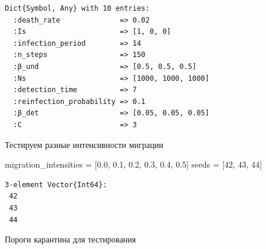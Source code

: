 \documentclass[
  12pt,
  a4paper,
  DIV=11,
  numbers=noendperiod]{scrreprt}
\newenvironment{Shaded}{\begin{snugshade}}{\end{snugshade}}
\newcommand{\FloatTok}[1]{\textcolor[rgb]{0.68,0.00,0.00}{#1}}
\newcommand{\NormalTok}[1]{\textcolor[rgb]{0.00,0.23,0.31}{#1}}
\newcommand{\OperatorTok}[1]{\textcolor[rgb]{0.37,0.37,0.37}{#1}}
\begin{document}
\begin{verbatim}
Dict{Symbol, Any} with 10 entries:
  :death_rate              => 0.02
  :Is                      => [1, 0, 0]
  :infection_period        => 14
  :n_steps                 => 150
  :β_und                   => [0.5, 0.5, 0.5]
  :Ns                      => [1000, 1000, 1000]
  :detection_time          => 7
  :reinfection_probability => 0.1
  :β_det                   => [0.05, 0.05, 0.05]
  :C                       => 3
\end{verbatim}

Тестируем разные интенсивности миграции

\begin{Shaded}
\begin{Highlighting}[]
\NormalTok{migration\_intensities }\OperatorTok{=}\NormalTok{ [}\FloatTok{0.0}\NormalTok{, }\FloatTok{0.1}\NormalTok{, }\FloatTok{0.2}\NormalTok{, }\FloatTok{0.3}\NormalTok{, }\FloatTok{0.4}\NormalTok{, }\FloatTok{0.5}\NormalTok{]}
\NormalTok{seeds }\OperatorTok{=}\NormalTok{ [}\FloatTok{42}\NormalTok{, }\FloatTok{43}\NormalTok{, }\FloatTok{44}\NormalTok{]}
\end{Highlighting}
\end{Shaded}

\begin{verbatim}
3-element Vector{Int64}:
 42
 43
 44
\end{verbatim}

Пороги карантина для тестирования
\end{document}
